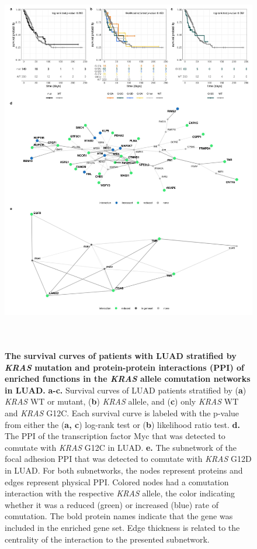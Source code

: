 \documentclass[english, 10pt, letterpaper]{article}
\newcommand{\KRAS}{\emph{KRAS}}
\begin{document}
\begin{figure}[p]
\centering
\includegraphics[height=170mm]{figures/Supp_Fig_4.jpeg}
\caption{
    \textbf{The survival curves of patients with LUAD stratified by \KRAS{} mutation and protein-protein interactions (PPI) of enriched functions in the \KRAS{} allele comutation networks in LUAD.}
    \textbf{a-c.} Survival curves of LUAD patients stratified by (\textbf{a}) \KRAS{} WT or mutant, (\textbf{b}) \KRAS{} allele, and (\textbf{c}) only \KRAS{} WT and \KRAS{} G12C. Each survival curve is labeled with the p-value from either the (\textbf{a, c}) log-rank test or (\textbf{b}) likelihood ratio test.
    \textbf{d.} The PPI of the transcription factor Myc that was detected to comutate with \KRAS{} G12C in LUAD.
    \textbf{e.} The subnetwork of the focal adhesion PPI that was detected to comutate with \KRAS{} G12D in LUAD.
    For both subnetworks, the nodes represent proteins and edges represent physical PPI. Colored nodes had a comutation interaction with the respective \KRAS{} allele, the color indicating whether it was a reduced (green) or increased (blue) rate of comutation.
    The bold protein names indicate that the gene was included in the enriched gene set.
    Edge thickness is related to the centrality of the interaction to the presented subnetwork.
}
\label{sfig:luad-comutation-supplementary}
\end{figure}
\end{document}
